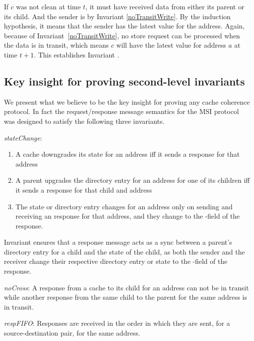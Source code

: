 If $c$ was not clean at time $t$, it must have received data from either its
parent or its child. And the sender is \clean{} by Invariant
\ref{noTransitWrite}. By the induction hypothesis, it means that the sender has
the latest value for the address. Again, because of
Invariant~\ref{noTransitWrite}, no store request can be processed when the data
is in transit, which means $c$ will have the latest value for address $a$ at
time $t+1$. This establishes Invariant .

\subsection{Key insight for proving second-level invariants}

We present what we believe to be the key insight for proving any cache coherence protocol.
In fact the request/response message semantics for the MSI protocol was designed to satisfy
the following three invariants.

\begin{inv}
\textit{stateChange}:
\begin{enumerate}
\item A cache downgrades its state for an address iff it sends a response for that address
\item A parent upgrades the directory entry for an address for one of its
children iff it sends a response for that child and address
\item The state or directory entry changes for an address only on sending and
receiving an response for that address, and they change to the \myto-field of the response.
\end{enumerate}
\label{stateChange}
\end{inv}

Invariant  ensures that a response message acts as a sync
between a parent's directory entry for a child and the state of the child, as
both the sender and the receiver change their respective directory entry or
state to the \myto-field of the response.

\begin{inv}
\textit{noCross}: A response from a cache to its child for an address can not
be in transit while another response from the same child to the parent for the
same address is in transit.
\label{noCross}
\end{inv}

\begin{inv}
\textit{respFIFO}: Responses are received in the order in which they are sent,
for a source-destination pair, for the same address.
\label{respFIFO}
\end{inv}

